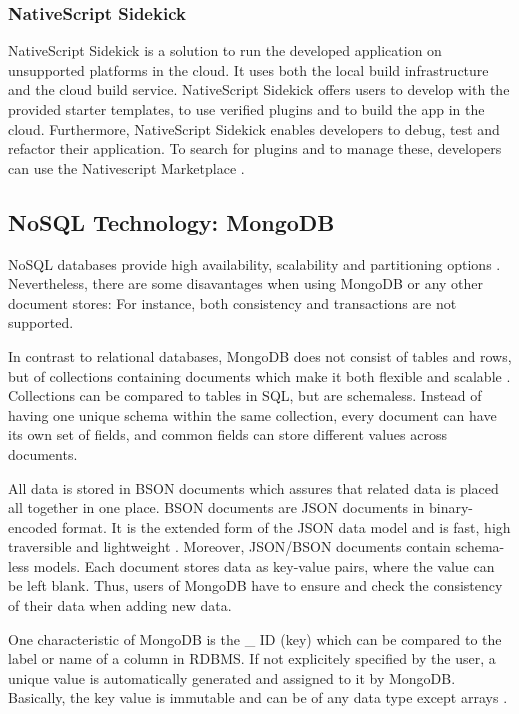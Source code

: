 \subsubsection{NativeScript Sidekick}\label{Native}

NativeScript Sidekick is a solution to run the developed application on unsupported platforms in the cloud. It uses both the local build infrastructure and the cloud build service. NativeScript Sidekick offers users to develop with the provided starter templates, to use verified plugins and to build the app in the cloud. Furthermore, NativeScript Sidekick enables developers to debug, test and refactor their application. 
To search for plugins and to manage these, developers can use the Nativescript Marketplace \cite{nsmarket}.

\subsection{NoSQL Technology: MongoDB}\label{mongodb}

NoSQL databases provide high availability, scalability and partitioning options \cite[p.25 ff.]{mongodb_edward}. Nevertheless, there are some disavantages when using MongoDB or any other document stores: For instance, both consistency and transactions are not supported. 

In contrast to relational databases, MongoDB does not consist of tables and rows, but of collections containing documents which make it both flexible and scalable \cite[p.25 ff.]{mongodb_edward}. Collections can be compared to tables in SQL, but are schemaless. Instead of having one unique schema within the same collection, every document can have its own set of fields, and common fields can store different values across documents.  

All data is stored in \ac{BSON} documents which assures that related data is placed all together in one place. BSON documents are JSON documents in binary-encoded format. It is the extended form of the JSON data model and is fast, high traversible and lightweight \cite[p.31 ff.]{mongodb_edward}. Moreover, JSON/BSON documents contain schema-less models. Each document stores data as key-value pairs, where the value can be left blank. Thus, users of MongoDB have to ensure and check the consistency of their data when adding new data.

One characteristic of MongoDB is the {\_} ID (key) which can be compared to the label or name of a column in RDBMS. If not explicitely specified by the user, a unique value is automatically generated and assigned to it by MongoDB. Basically, the key value is immutable and can be of any data type except arrays \cite[p.31 ff.]{mongodb_edward}.

